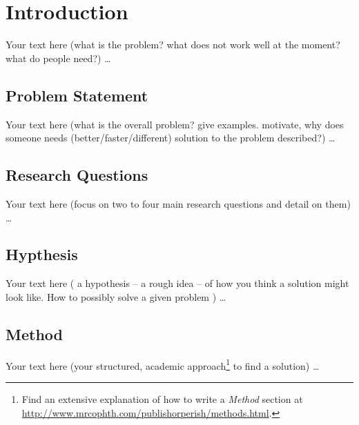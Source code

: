 \chapter{Introduction}\label{chap:intro}
\chapterstart


Your text here (what is the problem? what does not work well at the moment? what do people need?) \ldots

\section{Problem Statement}\label{sec:problem}

Your text here (what is the overall problem? give examples. motivate, why does someone needs (better/faster/different) solution to the problem described?) \ldots

\section{Research Questions}\label{sec:rq}

Your text here (focus on two to four main research questions and detail on them) \ldots

\section{Hypthesis}\label{sec:hypothesis}


Your text here ( a hypothesis -- a rough idea -- of how you think a solution might look like. How to possibly solve a given problem ) \ldots


\section{Method}\label{sec:method} %

Your text here (your structured, academic approach\footnote{Find an extensive explanation of how to write a \emph{Method} section at \url{http://www.mrcophth.com/publishorperish/methods.html}.} to find a solution) \ldots


\chapterend

